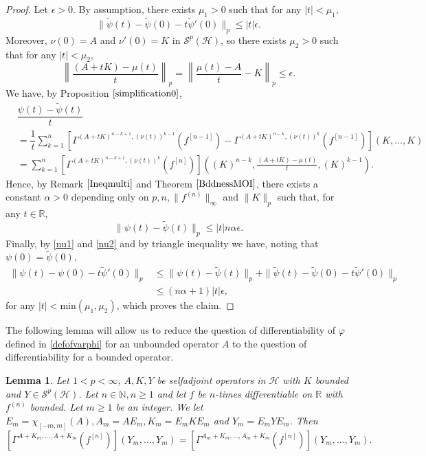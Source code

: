 \documentclass[12pt]{amsart}
\newtheorem{lemma}[theorem]{Lemma}
\theoremstyle{remark}
\newcommand{\N}{\mbox{${\mathbb N}$}}
\begin{document}
\begin{proof}
Let $\epsilon > 0$. By assumption, there exists $\mu_1 > 0$ such that for any $|t| < \mu_1$,
\begin{equation}\label{nu1}
\| \tilde{\psi}(t) - \tilde{\psi}(0) - t \tilde{\psi}'(0) \|_p \leq |t| \epsilon.
\end{equation}
Moreover, $\nu(0)=A$ and $\nu'(0) = K$ in $\mathcal{S}^p(\mathcal{H})$, so there exists $\mu_2 > 0$ such that for any $|t| < \mu_2$,
\begin{equation*}
\left\| \frac{(A+tK) - \mu(t)}{t} \right\|_p = \left\| \frac{\mu(t)-A}{t} -K \right\|_p \leq \epsilon.
\end{equation*}
We have, by Proposition $\ref{simplification0}$,
\begin{align*}
& \dfrac{\psi(t) - \tilde{\psi}(t)}{t}  \\
& = \dfrac{1}{t} \sum_{k=1}^n \left[ \Gamma^{(A+tK)^{n-k+1}, (\nu(t))^{k-1}}(f^{[n-1]})-\Gamma^{(A+tK)^{n-k}, (\nu(t))^k}(f^{[n-1]}) \right](K, \ldots, K) \\
& = \sum_{k=1}^{n} \left[ \Gamma^{(A+tK)^{n-k+1}, (\nu(t))^k}(f^{[n]})\right]\left( (K)^{n-k}, \frac{(A+tK) - \mu(t)}{t} , (K)^{k-1} \right).
\end{align*}
Hence, by Remark $\ref{Ineqmulti}$ and Theorem $\ref{BddnessMOI}$, there exists a constant $\alpha > 0$ depending only on $p, n, \|f^{(n)}\|_{\infty}$ and $\|K\|_p$ such that, for any $t\in \mathbb{R}$,
\begin{equation}\label{nu2}
\| \psi(t) - \tilde{\psi}(t) \|_p \leq |t| n \alpha \epsilon.
\end{equation}
Finally, by \eqref{nu1} and \eqref{nu2} and by triangle inequality we have, noting that $\psi(0) = \tilde{\psi}(0)$,
\begin{align*}
\| \psi(t) - \psi(0) - t \tilde{\psi}'(0) \|_p
& \leq \| \psi(t) -  \tilde{\psi}(t)\|_p + \| \tilde{\psi}(t) - \tilde{\psi}(0) - t \tilde{\psi}'(0) \|_p \\
& \leq (n\alpha + 1) |t| \epsilon,
\end{align*}
for any $|t| < \text{min}(\mu_1, \mu_2)$, which proves the claim.

\end{proof}


The following lemma will allow us to reduce the question of differentiability of $\varphi$ defined in \eqref{defofvarphi} for an unbounded operator $A$ to the question of differentiability for a bounded operator.


\begin{lemma}\label{reducbdd}
Let $1 < p < \infty$, $A,K,Y$ be selfadjoint operators in $\mathcal{H}$ with $K$ bounded and $Y\in \mathcal{S}^p(\mathcal{H})$. Let $n \in\N, n\geq 1$ and let $f$ be $n$-times differentiable on $\mathbb{R}$ with $f^{(n)}$ bounded. Let $m\geq 1$ be an integer. We let $E_m = \chi_{[-m,m]}(A), A_m = AE_m, K_m = E_m K E_m$ and $Y_m = E_m Y E_m$. Then
\begin{equation}\label{reducbddeq}
\left[\Gamma^{A+K_m, \ldots, A+K_m}(f^{[n]}) \right](Y_m, \ldots, Y_m) 
= \left[\Gamma^{A_m+K_m, \ldots, A_m+K_m}(f^{[n]}) \right](Y_m, \ldots, Y_m).
\end{equation}
\end{lemma}
\end{document}
